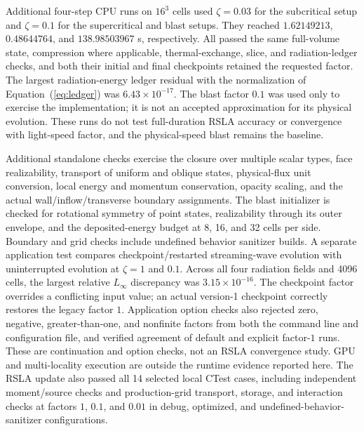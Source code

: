 \documentclass[manuscript]{aastex7}
\begin{document}
Additional four-step CPU runs on $16^3$ cells used $\zeta=0.03$ for the
subcritical setup and $\zeta=0.1$ for the supercritical and blast setups.
They reached $1.62149213$, $0.48644764$, and $138.98503967$ s, respectively.
All passed the same full-volume state, compression where applicable,
thermal-exchange, slice, and radiation-ledger checks, and both their
initial and final checkpoints retained the requested factor. The largest
radiation-energy ledger residual with the normalization of
Equation~(\ref{eq:ledger}) was $6.43\times10^{-17}$.
The blast factor $0.1$ was used only to exercise the implementation;
it is not an accepted approximation for its physical evolution.
These runs do not test full-duration RSLA accuracy or convergence with
light-speed factor, and the physical-speed blast remains the baseline.

Additional standalone checks exercise the closure over multiple scalar
types, face realizability, transport of uniform and oblique states,
physical-flux unit conversion, local energy and momentum conservation,
opacity scaling, and the actual wall/inflow/transverse boundary assignments.
The blast initializer is checked for rotational symmetry of point states,
realizability through its outer envelope, and the deposited-energy budget
at 8, 16, and 32 cells per side. Boundary and grid checks include undefined
behavior sanitizer builds. A separate application test compares
checkpoint/restarted streaming-wave evolution with uninterrupted evolution
at $\zeta=1$ and $0.1$. Across all four radiation fields and 4096 cells,
the largest relative $L_\infty$ discrepancy was $3.15\times10^{-16}$.
The checkpoint factor overrides a conflicting input value; an actual
version-1 checkpoint correctly restores the legacy factor $1$.
Application option checks also rejected zero, negative, greater-than-one,
and nonfinite factors from both the command line and configuration file,
and verified agreement of default and explicit factor-$1$ runs.
These are continuation and option checks, not an RSLA convergence study.
GPU and multi-locality execution are outside the runtime evidence
reported here.
The RSLA update also passed all 14 selected local CTest cases, including
independent moment/source checks and production-grid transport, storage,
and interaction checks at factors $1$, $0.1$, and $0.01$ in debug,
optimized, and undefined-behavior-sanitizer configurations.
\end{document}
